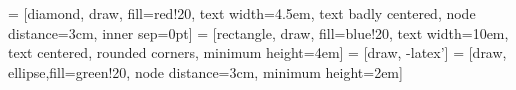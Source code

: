 \documentclass[
11pt, %
english, %
singlespacing, %
headsepline, %
]{MastersDoctoralThesis} %
\author{Unai \textsc{Aseguinolaza Aguirreche}} %
\begin{document}
\frontmatter %

\pagestyle{plain} %

 = [diamond, draw, fill=red!20, 
    text width=4.5em, text badly centered, node distance=3cm, inner sep=0pt]
 = [rectangle, draw, fill=blue!20, 
    text width=10em, text centered, rounded corners, minimum height=4em]
 = [draw, -latex']
 = [draw, ellipse,fill=green!20, node distance=3cm,
    minimum height=2em]

\end{document}
